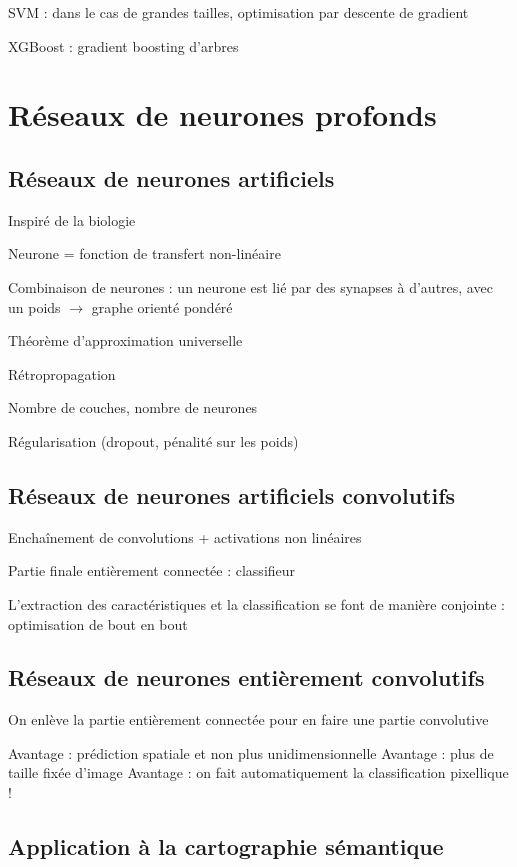 SVM : dans le cas de grandes tailles, optimisation par descente de gradient

XGBoost : gradient boosting d'arbres

\section{Réseaux de neurones profonds}

\subsection{Réseaux de neurones artificiels}

Inspiré de la biologie

Neurone = fonction de transfert non-linéaire

Combinaison de neurones : un neurone est lié par des synapses à d'autres, avec un poids
$\rightarrow$ graphe orienté pondéré

Théorème d'approximation universelle

Rétropropagation

Nombre de couches, nombre de neurones

Régularisation (dropout, pénalité sur les poids)

\subsection{Réseaux de neurones artificiels convolutifs}

Enchaînement de convolutions + activations non linéaires

Partie finale entièrement connectée : classifieur

L'extraction des caractéristiques et la classification se font de manière conjointe : optimisation de bout en bout

\subsection{Réseaux de neurones entièrement convolutifs}

On enlève la partie entièrement connectée pour en faire une partie convolutive

Avantage : prédiction spatiale et non plus unidimensionnelle
Avantage : plus de taille fixée d'image
Avantage : on fait automatiquement la classification pixellique !

\subsection{Application à la cartographie sémantique}

